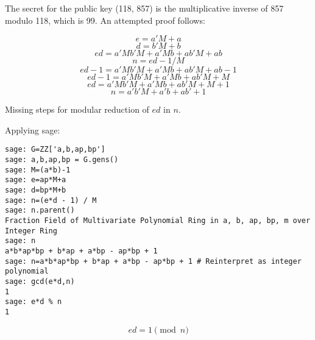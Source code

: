 \documentclass{article}
\begin{document}
The secret for the public key (118, 857) is the multiplicative inverse of 857 modulo 118, which is 99.
An attempted proof follows:

\[ e = a'M + a \]
\[ d = b'M + b \]
\[ ed = a'Mb'M + a'Mb + ab'M + ab \]
\[ n = ed-1/M \]
\[ ed-1 = a'Mb'M + a'Mb + ab'M + ab -1 \]
\[ ed-1 = a'Mb'M + a'Mb + ab'M + M \]
\[ ed = a'Mb'M + a'Mb + ab'M + M + 1 \]
\[ n =  a'b'M + a'b + ab' + 1 \]

Missing steps for modular reduction of $ed$ in $n$.

Applying sage:
\begin{verbatim}
sage: G=ZZ['a,b,ap,bp']
sage: a,b,ap,bp = G.gens()
sage: M=(a*b)-1
sage: e=ap*M+a
sage: d=bp*M+b
sage: n=(e*d - 1) / M
sage: n.parent()
Fraction Field of Multivariate Polynomial Ring in a, b, ap, bp, m over Integer Ring
sage: n
a*b*ap*bp + b*ap + a*bp - ap*bp + 1
sage: n=a*b*ap*bp + b*ap + a*bp - ap*bp + 1 # Reinterpret as integer polynomial
sage: gcd(e*d,n)
1
sage: e*d % n
1
\end{verbatim}

\[ ed = 1 \pmod n \]
\end{document}
